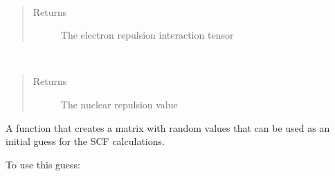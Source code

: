 \documentclass[letterpaper,10pt,english]{sphinxmanual}
\begin{document}
\begin{fulllineitems}

\begin{fulllineitems}
\label{\detokenize{GHF:ghf.GHF.GHF.get_two_e}}~\begin{quote}\begin{description}
\item[{Returns}] \leavevmode
The electron repulsion interaction tensor

\end{description}\end{quote}

\end{fulllineitems}


\begin{fulllineitems}
\label{\detokenize{GHF:ghf.GHF.GHF.nuc_rep}}~\begin{quote}\begin{description}
\item[{Returns}] \leavevmode
The nuclear repulsion value

\end{description}\end{quote}

\end{fulllineitems}


\begin{fulllineitems}
\label{\detokenize{GHF:ghf.GHF.GHF.random_guess}}
A function that creates a matrix with random values that can be used as an initial guess
for the SCF calculations.

To use this guess:


\end{fulllineitems}
\end{fulllineitems}
\end{document}
